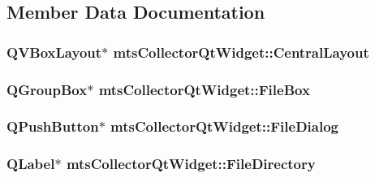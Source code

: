 \subsection{Member Data Documentation}
\hypertarget{classmts_collector_qt_widget_a68704bf96828912bf60f4da1b2e4b21c}{
\subsubsection[{Central\-Layout}]{\setlength{\rightskip}{0pt plus 5cm}Q\-V\-Box\-Layout$\ast$ mts\-Collector\-Qt\-Widget\-::\-Central\-Layout\hspace{0.3cm}{\ttfamily [protected]}}}\label{classmts_collector_qt_widget_a68704bf96828912bf60f4da1b2e4b21c}
\hypertarget{classmts_collector_qt_widget_a827f8b0d880b6425a417dacca2eb656b}{
\subsubsection[{File\-Box}]{\setlength{\rightskip}{0pt plus 5cm}Q\-Group\-Box$\ast$ mts\-Collector\-Qt\-Widget\-::\-File\-Box\hspace{0.3cm}{\ttfamily [protected]}}}\label{classmts_collector_qt_widget_a827f8b0d880b6425a417dacca2eb656b}
\hypertarget{classmts_collector_qt_widget_a7a8e39a5afad4d819164f7db40722e41}{
\subsubsection[{File\-Dialog}]{\setlength{\rightskip}{0pt plus 5cm}Q\-Push\-Button$\ast$ mts\-Collector\-Qt\-Widget\-::\-File\-Dialog\hspace{0.3cm}{\ttfamily [protected]}}}\label{classmts_collector_qt_widget_a7a8e39a5afad4d819164f7db40722e41}
\hypertarget{classmts_collector_qt_widget_a31c1ee375fd6a31bc44dfc86d266a352}{
\subsubsection[{File\-Directory}]{\setlength{\rightskip}{0pt plus 5cm}Q\-Label$\ast$ mts\-Collector\-Qt\-Widget\-::\-File\-Directory\hspace{0.3cm}{\ttfamily [protected]}}}\label{classmts_collector_qt_widget_a31c1ee375fd6a31bc44dfc86d266a352}
